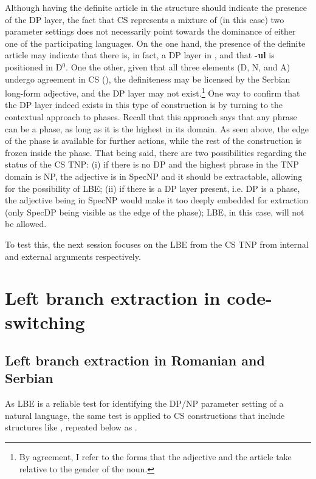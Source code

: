 \documentclass[output=paper,hidelinks,newtxmath,]{langscibook}
\begin{document}
Although having the definite article in the structure should indicate the presence of the DP layer, the fact that CS represents a mixture of (in this case) two parameter settings does not necessarily point towards the dominance of either one of the participating languages. On the one hand, the presence of the definite article may indicate that there is, in fact, a DP layer in , and that \textbf{-ul} is positioned in D$^0$. One the other, given that all three elements (D, N, and A) undergo agreement in CS (\citealt{Petroj}), the definiteness may be licensed by the Serbian long-form adjective, and the DP layer may not exist.\footnote{\label{15:fn8}By agreement, I refer to the forms that the adjective and the article take relative to the gender of the noun.} One way to confirm that the DP layer indeed exists in this type of construction is by turning to the contextual approach to phases. Recall that this approach says that any phrase can be a phase, as long as it is the highest in its domain. As seen above, the edge of the phase is available for further actions, while the rest of the construction is frozen inside the phase. That being said, there are two possibilities regarding the status of the CS TNP: (i) if there is no DP and the highest phrase in the TNP domain is NP, the adjective is in SpecNP and it should be extractable, allowing for the possibility of LBE; (ii) if there is a DP layer present, i.e. DP is a phase, the adjective being in SpecNP would make it too deeply embedded for extraction (only SpecDP being visible as the edge of the phase); LBE, in this case, will not be allowed.

To test this, the next session focuses on the LBE from the CS TNP from internal and external arguments respectively.\largerpage

\section{Left branch extraction in code-switching}\label{15:s5}
\subsection{Left branch extraction in Romanian and Serbian}\label{15:s5.1}

As LBE is a reliable test for identifying the DP/NP parameter setting of a natural language, the same test is applied to CS constructions that include structures like , repeated below as .
\end{document}
